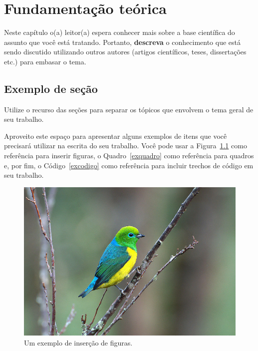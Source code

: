 \chapter{Fundamentação teórica}
\label{fundamentacao}

Neste capítulo o(a) leitor(a) espera conhecer mais sobre a base científica do assunto que você está tratando. Portanto, \textbf{descreva} o conhecimento que está sendo discutido utilizando outros autores (artigos científicos, teses, dissertações etc.) para embasar o tema.

\section{Exemplo de seção}

Utilize o recurso das seções para separar os tópicos que envolvem o tema geral de seu trabalho.

Aproveito este espaço para apresentar alguns exemplos de itens que você precisará utilizar na escrita do seu trabalho. Você pode usar a Figura~\ref{exfigura} como referência para inserir figuras, o Quadro~\ref{exquadro} como referência para quadros e, por fim, o Código~\ref{excodigo} como referência para incluir trechos de código em seu trabalho.

\begin{figure}[!htb]
\centering
\caption{Um exemplo de inserção de figuras.}
\label{exfigura}
\includegraphics[scale=0.5]{figuras/abntex2-modelo-livro-bandeirinha.jpg}
\end{figure}


